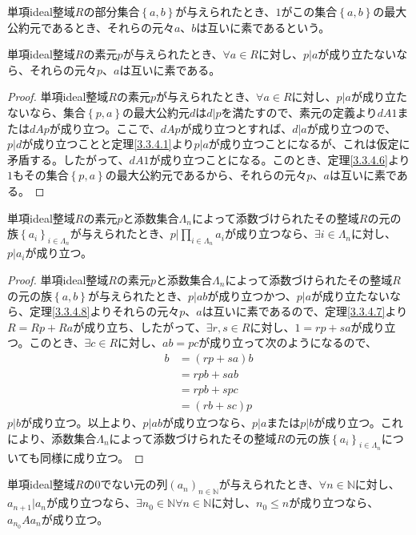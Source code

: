 \documentclass[dvipdfmx]{jsarticle}
\begin{document}
\begin{dfn}
単項ideal整域$R$の部分集合$\left\{ a,b \right\}$が与えられたとき、$1$がこの集合$\left\{ a,b \right\}$の最大公約元であるとき、それらの元々$a$、$b$は互いに素であるという。
\end{dfn}
\begin{thm}\label{3.3.4.8}
単項ideal整域$R$の素元$p$が与えられたとき、$\forall a \in R$に対し、$p|a$が成り立たないなら、それらの元々$p$、$a$は互いに素である。
\end{thm}
\begin{proof}
単項ideal整域$R$の素元$p$が与えられたとき、$\forall a \in R$に対し、$p|a$が成り立たないなら、集合$\left\{ p,a \right\}$の最大公約元$d$は$d|p$を満たすので、素元の定義より$dA1$または$dAp$が成り立つ。ここで、$dAp$が成り立つとすれば、$d|a$が成り立つので、$p|d$が成り立つことと定理\ref{3.3.4.1}より$p|a$が成り立つことになるが、これは仮定に矛盾する。したがって、$dA1$が成り立つことになる。このとき、定理\ref{3.3.4.6}より$1$もその集合$\left\{ p,a \right\}$の最大公約元であるから、それらの元々$p$、$a$は互いに素である。
\end{proof}
\begin{thm}\label{3.3.4.9}
単項ideal整域$R$の素元$p$と添数集合$\varLambda_{n}$によって添数づけられたその整域$R$の元の族$\left\{ a_{i} \right\}_{i \in \varLambda_{n}}$が与えられたとき、$p|\prod_{i \in \varLambda_{n}} a_{i}$が成り立つなら、$\exists i \in \varLambda_{n}$に対し、$p|a_{i}$が成り立つ。
\end{thm}
\begin{proof}
単項ideal整域$R$の素元$p$と添数集合$\varLambda_{n}$によって添数づけられたその整域$R$の元の族$\left\{ a,b \right\}$が与えられたとき、$p|ab$が成り立つかつ、$p|a$が成り立たないなら、定理\ref{3.3.4.8}よりそれらの元々$p$、$a$は互いに素であるので、定理\ref{3.3.4.7}より$R = Rp + Ra$が成り立ち、したがって、$\exists r,s \in R$に対し、$1 = rp + sa$が成り立つ。このとき、$\exists c \in R$に対し、$ab = pc$が成り立って次のようになるので、
\begin{align*}
b &= (rp + sa)b\\
&= rpb + sab\\
&= rpb + spc\\
&= (rb + sc)p
\end{align*}
$p|b$が成り立つ。以上より、$p|ab$が成り立つなら、$p|a$または$p|b$が成り立つ。これにより、添数集合$\varLambda_{n}$によって添数づけられたその整域$R$の元の族$\left\{ a_{i} \right\}_{i \in \varLambda_{n}}$についても同様に成り立つ。
\end{proof}
\begin{thm}\label{3.3.4.10}
単項ideal整域$R$の0でない元の列$\left( a_{n} \right)_{n \in \mathbb{N}}$が与えられたとき、$\forall n \in \mathbb{N}$に対し、$a_{n + 1}|a_{n}$が成り立つなら、$\exists n_{0} \in \mathbb{N}\forall n \in \mathbb{N}$に対し、$n_{0} \leq n$が成り立つなら、$a_{n_{0}}Aa_{n}$が成り立つ。
\end{thm}
\end{document}
